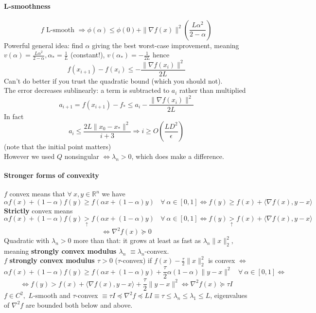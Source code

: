 \documentclass[10pt]{report}
\begin{document}
\paragraph{L-smoothness} $$f \text{ L-smooth }\Rightarrow \phi(\alpha) \leq \phi(0) + \|\nabla f(x)\|^2\left(\frac{L\alpha^2}{2-\alpha}\right)$$
Powerful general idea: find $\alpha$ giving the best worst-case improvement, meaning $v(\alpha) = \frac{L\alpha^2}{2-\alpha}, \alpha_* = \frac{1}{L}$ (constant!), $v(\alpha_*) = -\frac{1}{2L}$ hence $$f(x_{i+1}) - f(x_i) \leq -\frac{\|\nabla f(x_i)\|^2}{2L}$$ Can't do better if you trust the quadratic bound (which you should not).\\
The error decreases sublinearly: a term is subtracted to $a_i$ rather than multiplied $$a_{i+1} = f(x_{i+1}) - f_* \leq a_i - \frac{\|\nabla f(x_i)\|^2}{2L}$$
In fact $$a_i\leq \frac{2L\|x_0 - x_*\|^2}{i+3} \Rightarrow i\geq O\left(\frac{LD^2}{\epsilon}\right)$$ (note that the initial point matters)\\
However we used $Q$ nonsingular $\Leftrightarrow \lambda_n > 0$, which does make a difference.
\paragraph{Stronger forms of convexity}
$f$ convex means that $\forall\:x,y\in \mathbb{R}^n$ we have $$\alpha f(x) + (1-\alpha)f(y)\geq f(\alpha x+ (1-\alpha)y)\:\:\:\:\forall\:\alpha\in[0,1] \Leftrightarrow f(y)\geq f(x) + \langle \nabla f(x), y-x\rangle$$
\textbf{Strictly} convex means $$\alpha f(x) + (1-\alpha)f(y)\underset{\uparrow}{>} f(\alpha x+ (1-\alpha)y)\:\:\:\:\forall\:\alpha\in[0,1] \Leftrightarrow f(y)\underset{\uparrow}{>} f(x) + \langle \nabla f(x), y-x\rangle$$
$$\Leftrightarrow\nabla^2f(x)\succeq 0$$
Quadratic with $\lambda_n > 0$ more than that: it grows at least as fast as $\lambda_n\|x\|_2^2$, meaning \textbf{strongly convex modulus $\lambda_n$} $\equiv \lambda_n$-convex.\\
$f$ \textbf{strongly convex modulus $\tau > 0$} ($\tau$-convex) if $f(x)-\frac{\tau}{2}\|x\|_2^2$ is convex $\Leftrightarrow$ $$\alpha f(x) + (1-\alpha)f(y)\geq f(\alpha x+ (1-\alpha)y)+\frac{\tau}{2}\alpha(1-\alpha)\|y-x\|^2\:\:\:\:\forall\:\alpha\in[0,1] \Leftrightarrow$$ $$\Leftrightarrow f(y)> f(x) + \langle \nabla f(x), y-x\rangle+\frac{\tau}{2}\|y-x\|^2 \Leftrightarrow\nabla^2 f(x) \succeq \tau I$$
$f \in C^2,$ $L$-smooth and $\tau$-convex $\equiv \tau I \preceq \nabla^2 f\preceq LI \equiv \tau \leq \lambda_n \leq \lambda_1 \leq L$, eigenvalues of $\nabla^2 f$ are bounded both below and above.
\end{document}

